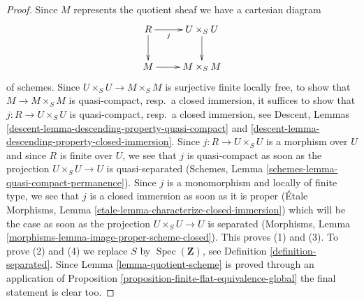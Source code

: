 \documentclass[10pt,a4paper]{amsart}
\theoremstyle{plain}
\theoremstyle{definition}
\theoremstyle{remark}
\numberwithin{equation}{subsection}
\def\Spec{\mathop{\mathrm{Spec}}}
\begin{document}
\begin{proof}
Since $M$ represents the quotient sheaf we have a cartesian diagram
$$
\xymatrix{
R \ar[r]_-j \ar[d] & U \times_S U \ar[d] \\
M \ar[r] & M \times_S M
}
$$
of schemes. Since $U \times_S U \to M \times_S M$ is surjective finite locally
free, to show that $M \to M \times_S M$ is quasi-compact, resp.\ a closed
immersion, it suffices to show that $j : R \to U \times_S U$ is
quasi-compact, resp.\ a closed immersion, see
Descent, Lemmas \ref{descent-lemma-descending-property-quasi-compact} and
\ref{descent-lemma-descending-property-closed-immersion}.
Since $j : R \to U \times_S U$ is a morphism over $U$ and since
$R$ is finite over $U$, we see that $j$ is quasi-compact as soon
as the projection $U \times_S U \to U$ is quasi-separated
(Schemes, Lemma \ref{schemes-lemma-quasi-compact-permanence}).
Since $j$ is a monomorphism and locally of finite type, we see that
$j$ is a closed immersion as soon as it is proper
(\'Etale Morphisms, Lemma \ref{etale-lemma-characterize-closed-immersion})
which will be the case as soon as the projection
$U \times_S U \to U$ is separated
(Morphisms, Lemma \ref{morphisms-lemma-image-proper-scheme-closed}).
This proves (1) and (3). To prove (2) and (4) we replace $S$ by
$\Spec(\mathbf{Z})$, see Definition \ref{definition-separated}.
Since Lemma \ref{lemma-quotient-scheme} is proved through an application of
Proposition \ref{proposition-finite-flat-equivalence-global}
the final statement is clear too.
\end{proof}
\end{document}
